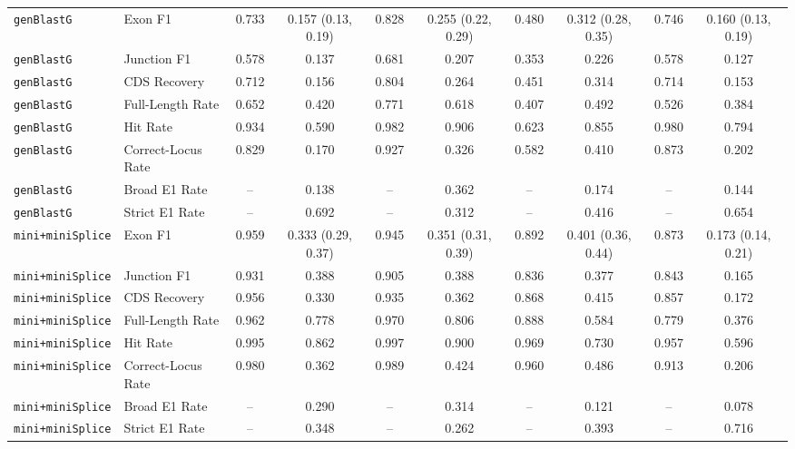 \begin{table}[t]
\begin{tabular}{llcccccccc}
\midrule
\texttt{genBlastG} & Exon F1 & 0.733 & 0.157 (0.13, 0.19) & 0.828 & 0.255 (0.22, 0.29) & 0.480 & 0.312 (0.28, 0.35) & 0.746 & 0.160 (0.13, 0.19) \\
\texttt{genBlastG} & Junction F1 & 0.578 & 0.137 & 0.681 & 0.207 & 0.353 & 0.226 & 0.578 & 0.127 \\
\texttt{genBlastG} & CDS Recovery & 0.712 & 0.156 & 0.804 & 0.264 & 0.451 & 0.314 & 0.714 & 0.153 \\
\texttt{genBlastG} & Full-Length Rate & 0.652 & 0.420 & 0.771 & 0.618 & 0.407 & 0.492 & 0.526 & 0.384 \\
\texttt{genBlastG} & Hit Rate & 0.934 & 0.590 & 0.982 & 0.906 & 0.623 & 0.855 & 0.980 & 0.794 \\
\texttt{genBlastG} & Correct-Locus Rate & 0.829 & 0.170 & 0.927 & 0.326 & 0.582 & 0.410 & 0.873 & 0.202 \\
\texttt{genBlastG} & Broad E1 Rate & -- & 0.138 & -- & 0.362 & -- & 0.174 & -- & 0.144 \\
\texttt{genBlastG} & Strict E1 Rate & -- & 0.692 & -- & 0.312 & -- & 0.416 & -- & 0.654 \\
\midrule
\texttt{mini+miniSplice} & Exon F1 & 0.959 & 0.333 (0.29, 0.37) & 0.945 & 0.351 (0.31, 0.39) & 0.892 & 0.401 (0.36, 0.44) & 0.873 & 0.173 (0.14, 0.21) \\
\texttt{mini+miniSplice} & Junction F1 & 0.931 & 0.388 & 0.905 & 0.388 & 0.836 & 0.377 & 0.843 & 0.165 \\
\texttt{mini+miniSplice} & CDS Recovery & 0.956 & 0.330 & 0.935 & 0.362 & 0.868 & 0.415 & 0.857 & 0.172 \\
\texttt{mini+miniSplice} & Full-Length Rate & 0.962 & 0.778 & 0.970 & 0.806 & 0.888 & 0.584 & 0.779 & 0.376 \\
\texttt{mini+miniSplice} & Hit Rate & 0.995 & 0.862 & 0.997 & 0.900 & 0.969 & 0.730 & 0.957 & 0.596 \\
\texttt{mini+miniSplice} & Correct-Locus Rate & 0.980 & 0.362 & 0.989 & 0.424 & 0.960 & 0.486 & 0.913 & 0.206 \\
\texttt{mini+miniSplice} & Broad E1 Rate & -- & 0.290 & -- & 0.314 & -- & 0.121 & -- & 0.078 \\
\texttt{mini+miniSplice} & Strict E1 Rate & -- & 0.348 & -- & 0.262 & -- & 0.393 & -- & 0.716 \\
\midrule
\end{tabular}
\end{table}